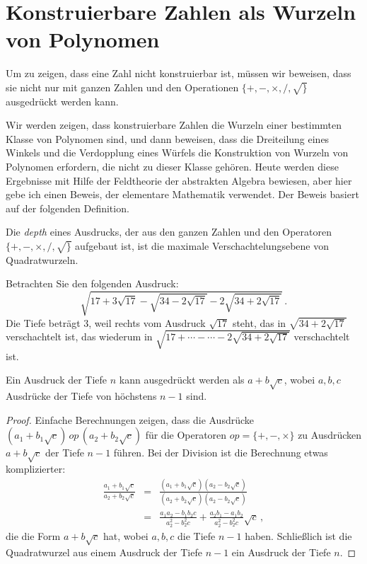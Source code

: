 \section{Konstruierbare Zahlen als Wurzeln von Polynomen}\label{s.trisect-poly}
Um zu zeigen, dass eine Zahl nicht konstruierbar ist, müssen wir beweisen, dass sie nicht nur mit ganzen Zahlen und den Operationen $\{+,-,\times,/,\surd\}$ ausgedrückt werden kann.

Wir werden zeigen, dass konstruierbare Zahlen die Wurzeln einer bestimmten Klasse von Polynomen sind, und dann beweisen, dass die Dreiteilung eines Winkels und die Verdopplung eines Würfels die Konstruktion von Wurzeln von Polynomen erfordern, die nicht zu dieser Klasse gehören. Heute werden diese Ergebnisse mit Hilfe der Feldtheorie der abstrakten Algebra bewiesen, aber hier gebe ich einen Beweis, der elementare Mathematik verwendet. Der Beweis basiert auf der folgenden Definition.

\begin{definition}
Die \emph{depth} eines Ausdrucks, der aus den ganzen Zahlen und den Operatoren $\{+,-,\times,/,\surd\}$ aufgebaut ist, ist die maximale Verschachtelungsebene von Quadratwurzeln.
\end{definition}

\begin{example}
Betrachten Sie den folgenden Ausdruck:
\[
\sqrt{17+3\sqrt{17} - \sqrt{34-2\sqrt{17}}
  -2\sqrt{34+2\sqrt{17}} }\,.
\]
Die Tiefe beträgt $3$, weil rechts vom Ausdruck $\sqrt{17}$ steht, das in $\sqrt{34+2\sqrt{17}}$ verschachtelt ist, das wiederum in
$\sqrt{17+\cdots-\cdots-2\sqrt{34+2\sqrt{17}}}$
verschachtelt ist.
\end{example}

\begin{theorem}
Ein Ausdruck der Tiefe $n$ kann ausgedrückt werden als $a+b\sqrt{c}$, wobei $a,b,c$ Ausdrücke der Tiefe von höchstens $n-1$ sind.
\end{theorem}
\begin{proof}
Einfache Berechnungen zeigen, dass die Ausdrücke $(a_1+b_1\sqrt{c})\,\mathit{op}\,(a_2+b_2\sqrt{c})$ für die Operatoren $\mathit{op}=\{+,-,\times\}$ zu Ausdrücken $a+b\sqrt{c}$ der Tiefe $n-1$ führen. Bei der Division ist die Berechnung etwas komplizierter:
\begin{eqnarray*}
\frac{a_1+b_1\sqrt{c}}{a_2+b_2\sqrt{c}}&=&
\frac{(a_1+b_1\sqrt{c})(a_2-b_2\sqrt{c})}{(a_2+b_2\sqrt{c})(a_2-b_2\sqrt{c})}\\
&=&\frac{a_1a_2-b_1b_2c}{a_2^2-b_2^2c}+\frac{a_2b_1-a_1b_2}{a_2^2-b_2^2c}\sqrt{c}\,,
\end{eqnarray*}
die die Form $a+b\sqrt{c}$ hat, wobei $a,b,c$ die Tiefe $n-1$ haben. Schließlich ist die Quadratwurzel aus einem Ausdruck der Tiefe $n-1$ ein Ausdruck der Tiefe $n$.
\end{proof}



